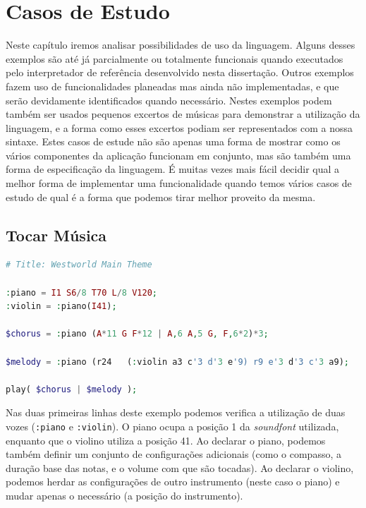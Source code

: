 \chapter{Casos de Estudo}
Neste capítulo iremos analisar possibilidades de uso da linguagem. Alguns desses exemplos são até já parcialmente ou totalmente funcionais quando executados pelo interpretador de referência desenvolvido nesta dissertação. Outros exemplos fazem uso de funcionalidades planeadas mas ainda não implementadas, e que serão devidamente identificados quando necessário.
Nestes exemplos podem também ser usados pequenos excertos de músicas para demonstrar a utilização da linguagem, e a forma como esses excertos podiam ser representados com a nossa sintaxe. Estes casos de estude não são apenas uma forma de mostrar como os vários componentes da aplicação funcionam em conjunto, mas são também uma forma de especificação da linguagem. É muitas vezes mais fácil decidir qual a melhor forma de implementar uma funcionalidade quando temos vários casos de estudo de qual é a forma que podemos tirar melhor proveito da mesma.

\section{Tocar Música}
\label{casestudies:westworld}
\begin{lstlisting}[caption=Exemplo da sintaxe para criação de música,language=PHP]
# Title: Westworld Main Theme

:piano = I1 S6/8 T70 L/8 V120;
:violin = :piano(I41);

$chorus = :piano (A*11 G F*12 | A,6 A,5 G, F,6*2)*3;

$melody = :piano (r24   (:violin a3 c'3 d'3 e'9) r9 e'3 d'3 c'3 a9);

play( $chorus | $melody );
\end{lstlisting}


Nas duas primeiras linhas deste exemplo podemos verifica a utilização de duas vozes (\texttt{:piano} e \texttt{:violin}). O piano ocupa a posição 1 da \textit{soundfont} utilizada, enquanto que o violino utiliza a posição 41. Ao declarar o piano, podemos também definir um conjunto de configurações adicionais (como o compasso, a duração base das notas, e o volume com que são tocadas). Ao declarar o violino, podemos herdar as configurações de outro instrumento (neste caso o piano) e mudar apenas o necessário (a posição do instrumento).

